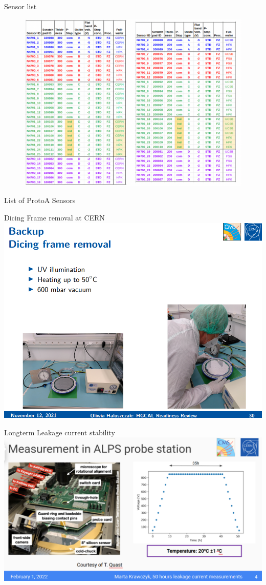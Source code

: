 \documentclass{beamer}
\begin{document}
\begin{frame}{Sensor list}
   \begin{figure}
       \includegraphics[width=.8\textwidth]{plots/Fall_2021_sensorList.png}
   \end{figure} 
\end{frame}


\begin{frame}{List of ProtoA Sensors}
    
\end{frame}

\begin{frame}{Dicing Frame removal at CERN}
  \includegraphics[width=.7\textwidth]{plots/DF_removal_Process.png}
\end{frame}

\begin{frame}{Longterm Leakage current stability}
  \includegraphics[width=.7\textwidth]{plots/Longterm_process.png}
\end{frame}
\end{document}
